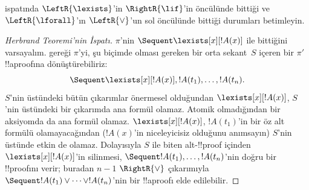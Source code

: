 \documentclass[../../../include/open-logic-section]{subfiles}
\begin{document}
\begin{prob}
 ispatında $\LeftR{\lexists}$'in $\RightR{\lif}$'in
öncülünde bittiği ve $\LeftR{\lforall}$'ın $\LeftR{\lor}$'un sol öncülünde
bittiği durumları betimleyin.
\end{prob}

\begin{proof}[Herbrand Teoremi'nin İspatı]
$\pi$'nin $\Sequent \lexists[x][!A(x)]$ ile bittiğini varsayalım.
 gereği $\pi$'yi, şu biçimde olması gereken bir orta
sekant~$S$ içeren bir $\pi'$ !!a{proof}{}ına dönüştürebiliriz:
\[
\Sequent \lexists[x][!A(x)], !A(t_1), \dots, !A(t_n).
\]
$S$'nin üstündeki bütün çıkarımlar önermesel olduğundan
$\lexists[x][!A(x)]$, $S$'nin üstündeki bir çıkarımda ana formül olamaz. Atomik
olmadığından bir aksiyomda da ana formül olamaz. $\lexists[x][!A(x)]$,
$!A(t_1)$'in bir öz alt formülü olamayacağından ($!A(x)$'in niceleyicisiz
olduğunu anımsayın) $S$'nin üstünde etkin de olamaz. Dolayısıyla $S$ ile biten
alt-!!{proof} içinden $\lexists[x][!A(x)]$'in silinmesi, $\Sequent !A(t_1),
\dots, !A(t_n)$'nin doğru bir !!{proof}{}ını verir; buradan $n-1$
$\RightR{\lor}$ çıkarımıyla $\Sequent !A(t_1) \lor \dots \lor !A(t_n)$'nin
bir !!a{proof}{}ı elde edilebilir.
\end{proof}

\end{document}
